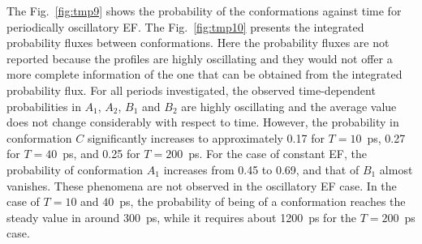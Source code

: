 \documentclass[a4paper,preprint,unsortedaddress,onecolumn]{revtex4-1}
\begin{document}
The Fig.~\ref{fig:tmp9} shows the probability of the
conformations against time for periodically oscillatory EF.  The
Fig.~\ref{fig:tmp10} presents the integrated probability fluxes between
conformations. Here the probability fluxes are not reported
because the profiles are highly oscillating and they would not offer 
 a more complete information of the one that can be obtained from the integrated probability flux.
For all periods investigated,
the observed time-dependent probabilities  in $A_1$, $A_2$, $B_1$ and $B_2$ are
highly oscillating and the average value does not change
considerably with respect to time.
However, the probability in conformation $C$ significantly
increases to approximately 0.17 for $T=10$~ps, 0.27 for  $T=40$~ps, and
0.25 for $T=200$~ps.
For the case of constant EF, the probability of conformation $A_1$
increases from 0.45 to 0.69, and that of $B_1$ almost vanishes.
These phenomena are not observed in the oscillatory EF case.
In the case of $T=10$ and $40$~ps, the probability of being of a conformation
reaches the steady value in around 300~ps, while it requires about 1200~ps
for the $T=200$~ps case. 
\end{document}
